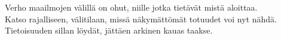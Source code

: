 \documentclass{article}
\begin{document}
\begin{infobox}
Verho maailmojen välillä on ohut, niille jotka tietävät mistä aloittaa.\\
Katso rajalliseen, välitilaan, missä näkymättömät totuudet voi nyt nähdä.\\
Tietoisuuden sillan löydät, jättäen arkinen kauas taakse.
\end{infobox}
\end{document}
